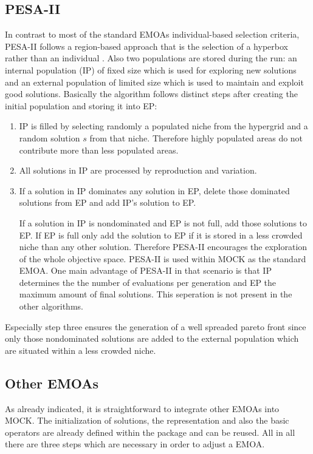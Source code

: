 \documentclass[parskip=half,DIV=14]{scrartcl}\usepackage[]{graphicx}\usepackage[]{color}
\begin{document}
\subsection{PESA-II}
In contrast to most of the standard EMOAs individual-based selection criteria, PESA-II follows a region-based approach that is the selection of a hyperbox rather than an individual \cite{pesa}. Also two populations are stored during the run: an internal population (IP) of fixed size which is used for exploring new solutions and an external population of limited size which is used to maintain and exploit good solutions. Basically the algorithm follows distinct steps after creating the initial population and storing it into EP:

\begin{enumerate}
\item IP is filled by selecting randomly a populated niche from the hypergrid and a random solution $s$ from that niche. Therefore highly populated areas do not contribute more than less populated areas.

\item All solutions in IP are processed by reproduction and variation.

\item If a solution in IP dominates any solution in EP, delete those dominated solutions from EP and add IP's solution to EP.

If a solution in IP is nondominated and EP is not full, add those solutions to EP. If EP is full only add the solution to EP if it is stored in a less crowded niche than any other solution. Therefore PESA-II encourages the exploration of the whole objective space. PESA-II is used within MOCK as the standard EMOA. One main advantage of PESA-II in that scenario is that IP determines the the number of evaluations per generation and EP the maximum amount of final solutions. This seperation is not present in the other algorithms.
\end{enumerate}

Especially step three ensures the generation of a well spreaded pareto front since only those nondominated solutions are added to the external population which are situated within a less crowded niche.  
\subsection{Other EMOAs}
As already indicated, it is straightforward to integrate other EMOAs into MOCK. The initialization of solutions, the representation and also the basic operators are already defined within the package and can be reused. All in all there are three steps which are necessary in order to adjust a EMOA.
\end{document}
